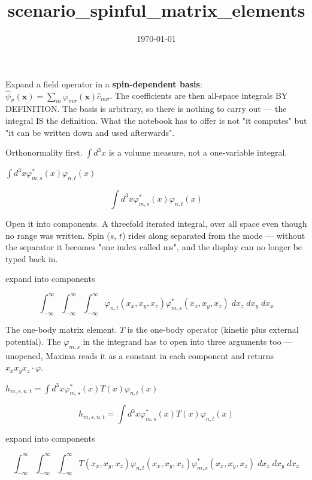 \documentclass[dvipdfmx]{article}
\title{scenario\_spinful\_matrix\_elements}
\date{\today}
\begin{document}
\maketitle

Expand a field operator in a \textbf{spin-dependent basis}: $\hat\psi_\sigma(\mathbf x)=\sum_m \varphi_{m\sigma}(\mathbf x)\hat c_{m\sigma}$. The coefficients are then all-space integrals BY DEFINITION. The basis is arbitrary, so there is nothing to carry out — the integral IS the definition. What the notebook has to offer is not "it computes" but "it can be written down and used afterwards".

Orthonormality first. $\int d^3x$ is a volume measure, not a one-variable integral.

$\int d^3x \varphi^{\ast}_{m,s}(x) \varphi_{n,t}(x)$

\begin{equation}
  \int d^3x \varphi^{\ast}_{m,s}(x) \varphi_{n,t}(x)
  \label{eq:E1}
\end{equation}

Open it into components. A threefold iterated integral, over all space even though no range was written. Spin ($s$, $t$) rides along separated from the mode — without the separator it becomes "one index called ms", and the display can no longer be typed back in.

expand into components

\begin{equation}
  \int_{-\infty }^{\infty }{\int_{-\infty }^{\infty }{\int_{-\infty }^{\infty }{\varphi_{n,t}(x_{x},x_{y},x_{z}) \varphi^{\ast}_{m,s}(x_{x},x_{y},x_{z})\;dx_{z}}\;dx_{y}}\;dx_{x}}
  \label{eq:E2}
\end{equation}

The one-body matrix element. $T$ is the one-body operator (kinetic plus external potential). The $\varphi_{m,s}$ in the integrand has to open into three arguments too — unopened, Maxima reads it as a constant in each component and returns $x_x x_y x_z \cdot \varphi$.

$h_{m,s,n,t} = \int d^3x \varphi^{\ast}_{m,s}(x) T(x) \varphi_{n,t}(x)$

\begin{equation}
  h_{m,s,n,t} = \int d^3x \varphi^{\ast}_{m,s}(x) T(x) \varphi_{n,t}(x)
  \label{eq:E3}
\end{equation}

expand into components

\begin{equation}
  \int_{-\infty }^{\infty }{\int_{-\infty }^{\infty }{\int_{-\infty }^{\infty }{T\left(x_{x} , x_{y} , x_{z}\right) \varphi_{n,t}(x_{x},x_{y},x_{z}) \varphi^{\ast}_{m,s}(x_{x},x_{y},x_{z})\;dx_{z}}\;dx_{y}}\;dx_{x}}
  \label{eq:E4}
\end{equation}
\end{document}
